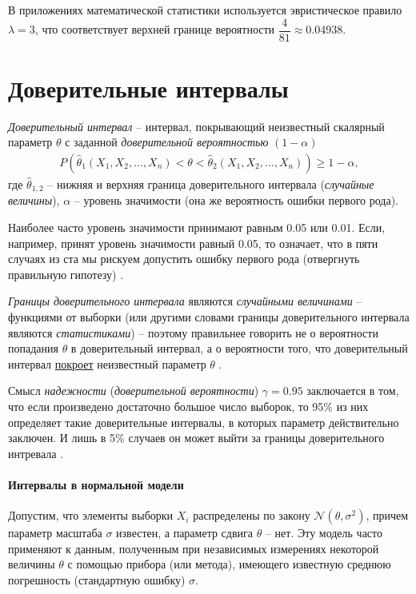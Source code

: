 \documentclass[%
	11pt,
	a4paper,
	utf8,
		]{article}
\begin{document}
В приложениях математической статистики используется эвристическое правило $ \lambda = 3 $, что соответствует верхней границе вероятности $ \dfrac{4}{81} \approx 0.04938 $.


\section{Доверительные интервалы}

\emph{Доверительный интервал} -- интервал, покрывающий неизвестный скалярный параметр $ \theta $ с заданной \emph{доверительной вероятностью} $ (1 - \alpha) $
\begin{align*}
	P(\hat{\theta}_1(X_1, X_2, \dots, X_n) < \theta < \hat{\theta}_2(X_1, X_2, \dots, X_n)) \geqslant 1 - \alpha,
\end{align*}
где $ \hat{\theta}_{1,2} $ -- нижняя и верхняя граница доверительного интервала (\emph{случайные величины}), $ \alpha $ -- уровень значимости (она же вероятность ошибки первого рода).

Наиболее часто уровень значимости принимают равным 0.05 или 0.01. Если, например, принят уровень значимости равный 0.05, то означает, что в пяти случаях из ста мы рискуем допустить ошибку первого рода (отвергнуть правильную гипотезу) \cite[284]{gmurman:1972}.

\emph{Границы доверительного интервала} являются \emph{случайными величинами} -- функциями от выборки (или другими словами границы доверительного интервала являются \emph{статистиками}) -- поэтому правильнее говорить не о вероятности попадания $ \theta $ в доверительный интервал, а о вероятности того, что доверительный интервал \underline{покроет} неизвестный параметр $ \theta $ \cite[]{gmurman:1972}.

Смысл \emph{надежности} (\emph{доверительной вероятности}) $ \gamma = 0.95 $ заключается в том, что если произведено достаточно большое число выборок, то 95\% из них определяет такие доверительные интервалы, в которых параметр действительно заключен. И лишь в 5\% случаев он может выйти за границы доверительного интревала \cite[]{gmurman:1972}.

\paragraph{Интервалы в нормальной модели} Допустим, что элементы выборки $ X_i $ распределены по закону $ \mathcal{N}(\theta, \sigma^2) $, причем параметр масштаба $ \sigma $ известен, а параметр сдвига $ \theta $ -- нет. Эту модель часто применяют к данным, полученным при независимых измерениях некоторой величины $ \theta $ с помощью прибора (или метода), имеющего известную среднюю погрешность (стандартную ошибку) $ \sigma $.
\end{document}
